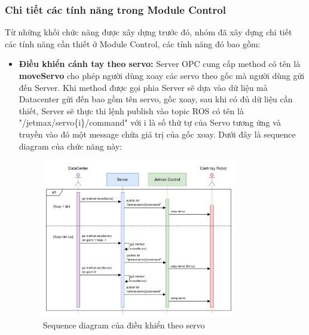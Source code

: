 \subsubsection{Chi tiết các tính năng trong Module Control}
Từ những khối chức năng được xây dựng trước đó, nhóm đã xây dựng chi tiết các tính năng cần thiết ở Module Control, các tính năng đó bao gồm:
\begin{itemize}

    \item \textbf{Điều khiển cánh tay theo servo:} Server OPC cung cấp method có tên là \textbf{moveServo} cho phép người dùng xoay các servo theo gốc mà người dùng gửi đến Server. Khi method được gọi phia Server sẽ dựa vào dữ liệu mà Datacenter gửi đến bao gồm tên servo, gốc xoay, sau khi có đủ dữ liệu cần thiết, Server sẽ thực thi lệnh publish vào topic ROS có tên là "/jetmax/servo\{i\}/command" với i là số thứ tự của Servo tương ứng và truyền vào đó một message chứa giá trị của gốc xoay. Dưới đây là sequence diagram của chức năng này:
    \begin{figure}[!h]
        \centering
        \includegraphics[width=0.8\textwidth]{Images/Implementation/Control/dieukhientheo_servo.jpg}
        \caption{Sequence diagram của điều khiển theo servo}
    \end{figure}

    
    

\end{itemize}
